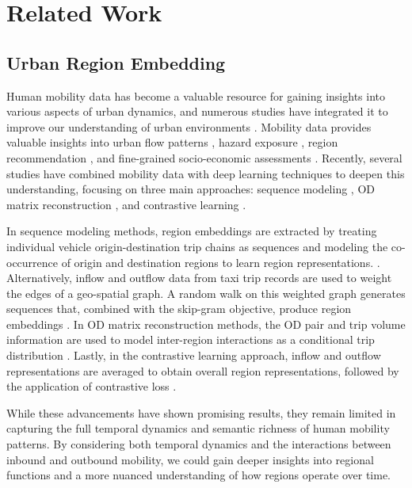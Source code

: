 \section{Related Work}
\subsection{Urban Region Embedding}
Human mobility data has become a valuable resource for gaining insights into various aspects of urban dynamics, and numerous studies have integrated it to improve our understanding of urban environments \cite{carroll2021community, chi2022microestimates, aiken2022machine, xia2023assessing, liu2021urban, liu2024exploring, gao2020semantic}. Mobility data provides valuable insights into urban flow patterns \cite{liu2021urban, chen2021multiple}, hazard exposure \cite{carroll2021community, xia2023assessing}, region recommendation \cite{liu2024exploring}, and fine-grained socio-economic assessments \cite{chi2022microestimates, aiken2022machine}. Recently, several studies have combined mobility data with deep learning techniques to deepen this understanding, focusing on three main approaches: sequence modeling \cite{yao2018representing, wang2017region}, OD matrix reconstruction \cite{kim2022effective, zhang2021multi, wu2022multi}, and contrastive learning \cite{li2024urban, zhang2022region}.

In sequence modeling methods, region embeddings are extracted by treating individual vehicle origin-destination trip chains as sequences and modeling the co-occurrence of origin and destination regions to learn region representations. \cite{yao2018representing}. Alternatively, inflow and outflow data from taxi trip records are used to weight the edges of a geo-spatial graph. A random walk on this weighted graph generates sequences that, combined with the skip-gram objective, produce region embeddings \cite{wang2017region}. In OD matrix reconstruction methods, the OD pair and trip volume information are used to model inter-region interactions as a conditional trip distribution \cite{kim2022effective, zhang2021multi}. Lastly, in the contrastive learning approach, inflow and outflow representations are averaged to obtain overall region representations, followed by the application of contrastive loss \cite{li2024urban, zhang2022region}. 

While these advancements have shown promising results, they remain limited in capturing the full temporal dynamics and semantic richness of human mobility patterns. By considering both temporal dynamics and the interactions between inbound and outbound mobility, we could gain deeper insights into regional functions and a more nuanced understanding of how regions operate over time.

